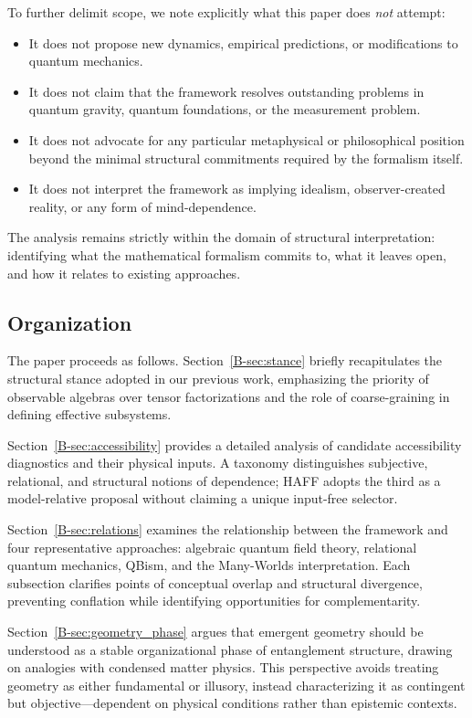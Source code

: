 \documentclass[12pt,a4paper,openany]{book}
\begin{document}
To further delimit scope, we note explicitly what this paper does \emph{not} attempt:

\begin{itemize}
\item It does not propose new dynamics, empirical predictions, or modifications to quantum mechanics.
\item It does not claim that the framework resolves outstanding problems in quantum gravity, quantum foundations, or the measurement problem.
\item It does not advocate for any particular metaphysical or philosophical position beyond the minimal structural commitments required by the formalism itself.
\item It does not interpret the framework as implying idealism, observer-created reality, or any form of mind-dependence.
\end{itemize}

The analysis remains strictly within the domain of structural interpretation: identifying what the mathematical formalism commits to, what it leaves open, and how it relates to existing approaches.

\subsection{Organization}

The paper proceeds as follows. Section~\ref{B-sec:stance} briefly recapitulates the structural stance adopted in our previous work, emphasizing the priority of observable algebras over tensor factorizations and the role of coarse-graining in defining effective subsystems. 

Section~\ref{B-sec:accessibility} provides a detailed analysis of candidate accessibility diagnostics and their physical inputs. A taxonomy distinguishes subjective, relational, and structural notions of dependence; HAFF adopts the third as a model-relative proposal without claiming a unique input-free selector.

Section~\ref{B-sec:relations} examines the relationship between the framework and four representative approaches: algebraic quantum field theory, relational quantum mechanics, QBism, and the Many-Worlds interpretation. Each subsection clarifies points of conceptual overlap and structural divergence, preventing conflation while identifying opportunities for complementarity.

Section~\ref{B-sec:geometry_phase} argues that emergent geometry should be understood as a stable organizational phase of entanglement structure, drawing on analogies with condensed matter physics. This perspective avoids treating geometry as either fundamental or illusory, instead characterizing it as contingent but objective—dependent on physical conditions rather than epistemic contexts.
\end{document}
